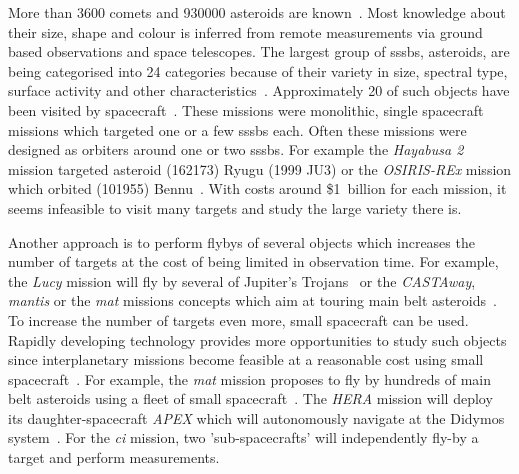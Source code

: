 More than \SI{3600}{} comets and \SI{930000}{} asteroids are known~\cite{nasaSBD_count, mpc2020}. Most knowledge about their size, shape and colour is inferred from remote measurements via ground based observations and space telescopes. The largest group of \glspl{sssb}, asteroids, are being categorised into \SI{24}{} categories because of their variety in size, spectral type, surface activity and other characteristics~\cite{demeo2009extension}. Approximately \SI{20}{} of such objects have been visited by spacecraft~\cite{nasaSBD_missions}. These missions were monolithic, single spacecraft missions which targeted one or a few \glspl{sssb} each. Often these missions were designed as orbiters around one or two \glspl{sssb}. For example the \textit{Hayabusa 2} mission targeted asteroid (162173) Ryugu (1999 JU3) or the \textit{OSIRIS-REx} mission which orbited (101955) Bennu~\cite{Watanabe2017Hayabusa2Overview, lauretta2017osiris}. With costs around \$1~billion for each mission, it seems infeasible to visit many targets and study the large variety there is.

Another approach is to perform flybys of several objects which increases the number of targets at the cost of being limited in observation time. For example, the \textit{Lucy} mission will fly by several of Jupiter's Trojans~\cite{stanbridge2017lucy} or the \textit{CASTAway}, \textit{\gls{mantis}} or the \textit{\gls{mat}} missions concepts which aim at touring main belt asteroids~\cite{bowles2018castaway, rivkin2016mainmantis}. To increase the number of targets even more, small spacecraft can be used. Rapidly developing technology provides more opportunities to study such objects since interplanetary missions become feasible at a reasonable cost using small spacecraft~\cite{Poghosyan2017CubeSatMissions, andrews2019asteroid, snodgrass2019europeanCI}. For example, the \textit{\gls{mat}} mission proposes to fly by hundreds of main belt asteroids using a fleet of small spacecraft~\cite{Slavinskis2018NanospacecraftSails}. The \textit{HERA} mission will deploy its daughter-spacecraft \textit{APEX} which will autonomously navigate at the Didymos system~\cite{Kohout2018FeasibilityStudy}. For the \textit{\gls{ci}} mission, two 'sub-spacecrafts' will independently fly-by a target and perform measurements\cite{snodgrass2019europeanCI}.

